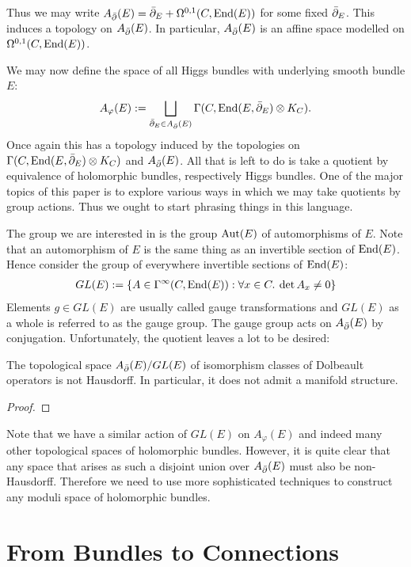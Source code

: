 \documentclass[12pt]{ociamthesis}  %
\begin{document}
Thus we may write $A_{\bar{\partial}} (E) = {\bar{\partial}}_E + \Omega^{0,1}(C,\operatorname{End}(E))$
for some fixed ${\bar{\partial}}_E$. This induces a topology on $A_{\bar{\partial}} (E)$.
In particular, $A_{\bar{\partial}} (E)$ is an affine space modelled on
$\Omega^{0,1}(C,\operatorname{End}(E))$.

We may now define the space of all Higgs bundles with underlying
smooth bundle $E$:
\begin{align*}
  A_\varphi(E) := \bigsqcup_{{\bar{\partial}}_E \in A_{\bar{\partial}} (E)} \Gamma(C,\operatorname{End}(E,{\bar{\partial}}_E)\otimes K_C).
\end{align*}
Once again this has a topology induced by the topologies on
$\Gamma(C,\operatorname{End}(E,{\bar{\partial}}_E)\otimes K_C)$ and $A_{\bar{\partial}} (E)$.
All that is left to do is take a quotient by equivalence of holomorphic
bundles, respectively Higgs bundles. One of the major topics of this
paper is to explore various ways in which we may take quotients by
group actions. Thus we ought to start phrasing things in this language.

The group we are interested in is the group $\operatorname{Aut}(E)$ of automorphisms
of $E$. Note that an automorphism of $E$ is the same thing as
an invertible section of $\operatorname{End}(E)$. Hence consider the group
of everywhere invertible sections of $\operatorname{End}(E)$:
\begin{align*}
  GL(E) := \{A \in \Gamma^\infty(C,\operatorname{End}(E)) : \forall x \in C.\:\det A_x \neq 0\}
\end{align*}
Elements $g\in GL(E)$ are usually called gauge transformations and
$GL(E)$ as a whole is referred to as the gauge group.
The gauge group acts on $A_{\bar{\partial}}(E)$ by conjugation.
Unfortunately, the quotient leaves a lot to be desired:
\begin{lemma}
  The topological space $A_{\bar{\partial}} (E)/GL(E)$ of isomorphism classes of
  Dolbeault operators is not Hausdorff. In particular, it does not
  admit a manifold structure.
  \begin{proof}
    \missingproof
  \end{proof}
\end{lemma}

Note that we have a similar action of $GL(E)$ on $A_\varphi(E)$ and
indeed many other topological spaces of holomorphic bundles. However,
it is quite clear that any space that arises as such a disjoint union
over $A_{\bar{\partial}} (E)$ must also be non-Hausdorff. Therefore we need
to use more sophisticated techniques to construct any moduli
space of holomorphic bundles.

\section{From Bundles to Connections}
\end{document}
